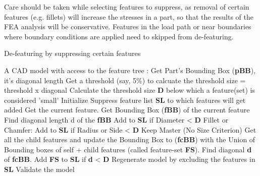Care should be taken while selecting features to suppress, as removal of certain features (e.g. fillets) will increase the stresses in a part, so that the results of the FEA analysis will be conservative. Features in the load path or near boundaries where boundary conditions are applied need to skipped from de-featuring.

\begin{algorithm}
	\caption{De-featuring by suppressing certain features}
	\label{alg1}
	\begin{algorithmic}
		\REQUIRE A CAD model with access to the feature tree
		: Get Part's Bounding Box ({\bf pBB}), it's diagonal length 
		\STATE Get a threshold (say, 5\%) to calcuate the threshold size = threshold x diagonal
		\STATE Calculate the threshold size {\bf D} below which a feature(set) is considered  'small'
		\STATE  Initialize Suppress feature list {\bf SL} to which features will get added
			\STATE Get the current feature.
			\STATE Get Bounding Box ({\bf fBB}) of the current feature 
			\STATE Find diagonal length d of the {\bf fBB}
				\STATE Add to {\bf SL} if Diameter  <   {\bf D}
			\ENDIF
				\STATE  Fillet or Chamfer: Add to {\bf SL} if Radius or Side  <  {\bf D}
			\ENDIF
				\STATE  Keep Master (No Size Criterion)
			\ENDIF
				 \STATE Get all the child features and update the Bounding Box to ({\bf fcBB}) with the Union of Bounding boxes of self + child features (called feature-set {\bf FS}). 
				\STATE Find diagonal  {\bf d} of {\bf fcBB}. Add {\bf FS} to {\bf SL} if  {\bf d} <  {\bf D}
			\ENDIF
		\ENDWHILE
		\STATE  Regenerate model by excluding the features in {\bf SL}
		\STATE  Validate the model
	\end{algorithmic}
\end{algorithm}

